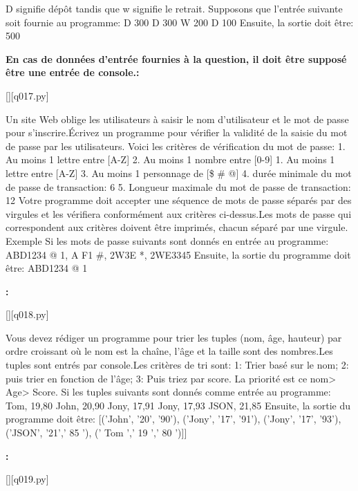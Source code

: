D signifie dépôt tandis que w signifie le retrait.
Supposons que l'entrée suivante soit fournie au programme:
D 300
D 300
W 200
D 100
Ensuite, la sortie doit être:
500
\par
\textbf{En cas de données d'entrée fournies à la question, il doit être supposé être une entrée de console.:}
\renewcommand{\nomfichier}{q017.py}
\begin{solution}
    \pythonfile{\chemincode \nomfichier}[][q017.py]
\end{solution}


\question
Un site Web oblige les utilisateurs à saisir le nom d'utilisateur et le mot de passe pour s'inscrire.Écrivez un programme pour vérifier la validité de la saisie du mot de passe par les utilisateurs.
Voici les critères de vérification du mot de passe:
1. Au moins 1 lettre entre [A-Z]
2. Au moins 1 nombre entre [0-9]
1. Au moins 1 lettre entre [A-Z]
3. Au moins 1 personnage de [\$ \# @]
4. durée minimale du mot de passe de transaction: 6
5. Longueur maximale du mot de passe de transaction: 12
Votre programme doit accepter une séquence de mots de passe séparés par des virgules et les vérifiera conformément aux critères ci-dessus.Les mots de passe qui correspondent aux critères doivent être imprimés, chacun séparé par une virgule.
Exemple
Si les mots de passe suivants sont donnés en entrée au programme:
ABD1234 @ 1, A F1 \#, 2W3E *, 2WE3345
Ensuite, la sortie du programme doit être:
ABD1234 @ 1
\par
\textbf{:}
\renewcommand{\nomfichier}{q018.py}
\begin{solution}
    \pythonfile{\chemincode \nomfichier}[][q018.py]
\end{solution}


\question
Vous devez rédiger un programme pour trier les tuples (nom, âge, hauteur) par ordre croissant où le nom est la chaîne, l'âge et la taille sont des nombres.Les tuples sont entrés par console.Les critères de tri sont:
1: Trier basé sur le nom;
2: puis trier en fonction de l'âge;
3: Puis triez par score.
La priorité est ce nom> Age> Score.
Si les tuples suivants sont donnés comme entrée au programme:
Tom, 19,80
John, 20,90
Jony, 17,91
Jony, 17,93
JSON, 21,85
Ensuite, la sortie du programme doit être:
[('John', '20', '90'), ('Jony', '17', '91'), ('Jony', '17', '93'), ('JSON', '21',' 85 '), (' Tom ',' 19 ',' 80 ')]]
\par
\textbf{:}
\renewcommand{\nomfichier}{q019.py}
\begin{solution}
    \pythonfile{\chemincode \nomfichier}[][q019.py]
\end{solution}


